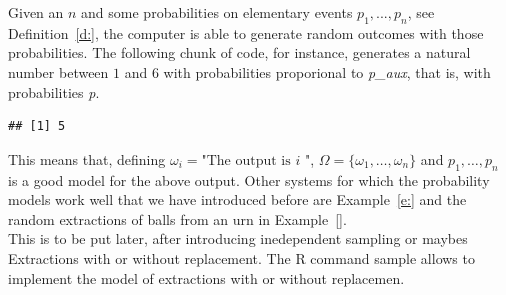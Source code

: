 	Given an $n$ and some probabilities on elementary events $p_1,..., p_n$, see Definition~\ref{d:}, the computer is able to generate random outcomes with those probabilities. The following chunk of code, for instance, generates a natural number between $1$ and $6$ with probabilities proporional to \textit{p\_aux}, that is, with probabilities \textit{p}.  
\begin{knitrout}
\color{fgcolor}\begin{kframe}
\begin{alltt}
 \hlkwb{<-}   
 \hlkwb{<-} \hldef{(}\hldef{,}\hldef{,}\hldef{,}\hldef{,}\hldef{,}\hldef{)} 
 \hlkwb{<-} \hlopt{/} 
\hldef{(}\hlopt{:} \hldef{,}   
\end{alltt}
\begin{verbatim}
## [1] 5
\end{verbatim}
\end{kframe}
\end{knitrout}
	
	This means that,  defining $\omega_i = \text{"The output is $i$ "}$, $\Omega = \{\omega_1, \ldots ,\omega_n\}$ and $p_1,\ldots, p_n$ is a good model for the above output. Other systems for which the probability models work well that we have introduced before are Example~\ref{e:} and the random extractions of balls from an urn in Example~\ref{}.\\

	This is to be put later, after introducing  inedependent sampling or maybes  
	Extractions with or without replacement. The R command sample allows to implement the model of extractions with or without replacemen.
	

